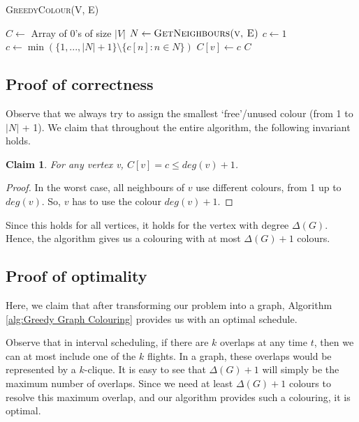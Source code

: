 \documentclass[12pt, a4paper]{report}
\newtheorem{claim}{Claim}
\begin{document}
\begin{algorithm}[h!]
\begin{algorithmic}[1]
\caption{\textsc{GreedyColour}(V, E)}
\label{alg:Greedy Graph Colouring}
\STATE $C \leftarrow$ Array of 0's of size $\vert V \vert$
	\STATE $N \leftarrow \textsc{GetNeighbours(v, E)}$
	\STATE $c \leftarrow 1$
		\STATE $c \leftarrow \min(\{1, ... , \vert N \vert + 1\} \setminus \{c[n] : n \in N\})$
	\ENDFOR
	\STATE $C[v] \leftarrow c$
\ENDFOR
\RETURN $C$
\end{algorithmic}
\end{algorithm}

\subsection{Proof of correctness}
Observe that we always try to assign the smallest `free'/unused colour (from 1 to $\vert N \vert$ + 1). We claim that throughout the entire algorithm, the following invariant holds.

\hspace{0pt}
\begin{claim}
For any vertex v, $C[v] = c \leq deg(v) + 1$.
\end{claim}
\begin{proof}
In the worst case, all neighbours of $v$ use different colours, from 1 up to $deg(v)$. So, $v$ has to use the colour $deg(v) + 1$.
\end{proof}

Since this holds for all vertices, it holds for the vertex with degree $\Delta(G)$. Hence, the algorithm gives us a colouring with at most $\Delta(G) + 1$ colours.

\subsection{Proof of optimality}
Here, we claim that after transforming our problem into a graph, Algorithm \ref{alg:Greedy Graph Colouring} provides us with an optimal schedule.

Observe that in interval scheduling, if there are $k$ overlaps at any time $t$, then we can at most include one of the $k$ flights. In a graph, these overlaps would be represented by a $k$-clique. It is easy to see that $\Delta(G) + 1$ will simply be the maximum number of overlaps. Since we need at least $\Delta(G) + 1$ colours to resolve this maximum overlap, and our algorithm provides such a colouring, it is optimal.
\end{document}
